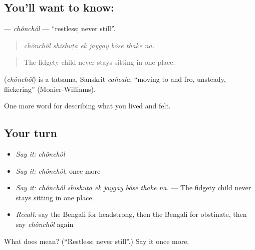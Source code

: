 \subsection*{You'll want to know: }
\textbf{} — \emph{chônchôl} — \textquotedblleft{}restless; never still\textquotedblright{}.

\begin{quote}
      
\end{quote}

\begin{quote}
\emph{chônchôl shishuṭā ek jāygāy bôse thāke nā.}
\end{quote}

\begin{quote}
The fidgety child never stays sitting in one place.
\end{quote}

\begin{cousinweb}
\textbf{} (\emph{chônchôl}) is a tatsama, Sanskrit \emph{cañcala}, \textquotedblleft{}moving to and fro, unsteady, flickering\textquotedblright{} (Monier-Williams).
\end{cousinweb}

\begin{grammarlens}[title={What you've built}]
One more word for describing what you lived and felt.
\end{grammarlens}

\subsection*{Your turn}
\begin{itemize}
\raggedright
  \item \emph{Say it:} \emph{chônchôl}
  \item \emph{Say it:} \emph{chônchôl}, once more
  \item \emph{Say it:} \emph{chônchôl shishuṭā ek jāygāy bôse thāke nā.} — The fidgety child never stays sitting in one place.
  \item \emph{Recall:} say the Bengali for headstrong, then the Bengali for obstinate, then say \emph{chônchôl} again
\end{itemize}

\begin{tcolorbox}[breakable,colback=teal!4,colframe=teal!35!black,title={Before you move on}]
What does  mean? (\textquotedblleft{}Restless; never still\textquotedblright{}.) Say it once more.
\end{tcolorbox}
